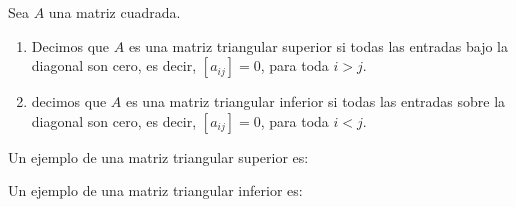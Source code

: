 \begin{definicion}{}{}
    Sea $A$ una matriz cuadrada.
    \begin{enumerate}[label=\roman*), topsep=6pt, itemsep=0pt]
        \item Decimos que $A$ es una matriz triangular superior si todas las entradas bajo la diagonal son cero, es decir, $[ a_{ij} ] = 0$, para toda $i > j$.
        \item decimos que $A$ es una matriz triangular inferior si todas las entradas sobre la diagonal son cero, es decir, $[ a_{ij} ] = 0$, para toda $i < j$.
    \end{enumerate}
\end{definicion}

\newpage

\begin{examplebox}{}{}
    Un ejemplo de una matriz triangular superior es:
    \begin{matrizn}
    \end{matrizn}
    Un ejemplo de una matriz triangular inferior es:
    \begin{matrizn}
    \end{matrizn}
\end{examplebox}

